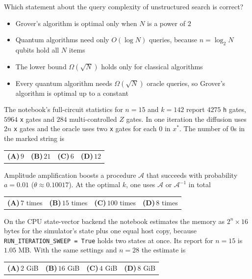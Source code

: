 \documentclass[11pt,a4paper]{article}
\newcommand{\optlabel}[1]{\textbf{(#1)}}
\newenvironment{qitem}[1]{\begin{list}{}{\setlength{\leftmargin}{3.3em}\setlength{\labelwidth}{3.1em}%
  \setlength{\labelsep}{0.2em}\setlength{\topsep}{3pt}\setlength{\parsep}{3pt}}\item[\textbf{Q.#1}\hfill]}{\end{list}}
\newcommand{\qsep}{\par\vspace{2pt}{\color{black!15}\hrule}\vspace{4pt}}
\begin{document}
\begin{qitem}{64}
Which statement about the query complexity of unstructured search is correct?
\begin{itemize}[leftmargin=2.6em, labelsep=0.4em, itemsep=2pt, topsep=3pt]
\item[\optlabel{A}] Grover's algorithm is optimal only when $N$ is a power of $2$
\item[\optlabel{B}] Quantum algorithms need only $O(\log N)$ queries, because $n = \log_2 N$ qubits hold all $N$ items
\item[\optlabel{C}] The lower bound $\Omega(\sqrt N)$ holds only for classical algorithms
\item[\optlabel{D}] Every quantum algorithm needs $\Omega(\sqrt N)$ oracle queries, so Grover's algorithm is optimal up to a constant
\end{itemize}
\end{qitem}
\qsep

\begin{qitem}{65}
The notebook's full-circuit statistics for $n = 15$ and $k = 142$ report $4275$ \texttt{h} gates, $5964$ \texttt{x} gates and $284$ multi-controlled $Z$ gates. In one iteration the diffusion uses $2n$ \texttt{x} gates and the oracle uses two \texttt{x} gates for each $0$ in $x^\ast$. The number of $0$s in the marked string is
\par\smallskip\noindent\begin{tabularx}{\linewidth}{@{}*{4}{L}@{}}
\optlabel{A}\,$9$ & \optlabel{B}\,$21$ & \optlabel{C}\,$6$ & \optlabel{D}\,$12$
\end{tabularx}
\end{qitem}
\qsep

\begin{qitem}{66}
Amplitude amplification boosts a procedure $\mathcal{A}$ that succeeds with probability $a = 0.01$ ($\theta \approx 0.10017$). At the optimal $k$, one uses $\mathcal{A}$ or $\mathcal{A}^{-1}$ in total
\par\smallskip\noindent\begin{tabularx}{\linewidth}{@{}*{4}{L}@{}}
\optlabel{A}\,$7$ times & \optlabel{B}\,$15$ times & \optlabel{C}\,$100$ times & \optlabel{D}\,$8$ times
\end{tabularx}
\end{qitem}
\qsep

\begin{qitem}{67}
On the CPU state-vector backend the notebook estimates the memory as $2^n \times 16$ bytes for the simulator's state plus one equal host copy, because \texttt{RUN\_ITERATION\_SWEEP = True} holds two states at once. Its report for $n = 15$ is $1.05$ MB. With the same settings and $n = 28$ the estimate is
\par\smallskip\noindent\begin{tabularx}{\linewidth}{@{}*{4}{L}@{}}
\optlabel{A}\,$2$ GiB & \optlabel{B}\,$16$ GiB & \optlabel{C}\,$4$ GiB & \optlabel{D}\,$8$ GiB
\end{tabularx}
\end{qitem}
\qsep
\end{document}
